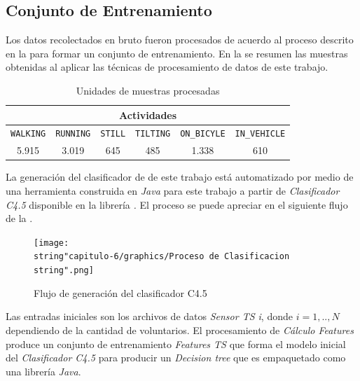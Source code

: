 \subsection{Conjunto de Entrenamiento }

Los datos recolectados en bruto fueron procesados de acuerdo al proceso
descrito en la  para formar un conjunto
de entrenamiento. En la  se resumen las muestras
obtenidas al aplicar las técnicas de procesamiento de datos de este
trabajo. 

\begin{table}[h]
\begin{centering}
\begin{tabular}{|c|c|c|c|c|c|}
\hline 
\multicolumn{6}{|c|}{Actividades}\tabularnewline
\hline 
\texttt{\footnotesize{}WALKING} & \texttt{\footnotesize{}RUNNING} & \texttt{\footnotesize{}STILL} & \texttt{\footnotesize{}TILTING} & \texttt{\footnotesize{}ON\_BICYLE} & \texttt{\footnotesize{}IN\_VEHICLE}\tabularnewline
\hline 
\hline 
5.915 & 3.019 & 645 & 485 & 1.338 & 610\tabularnewline
\hline 
\end{tabular}
\par\end{centering}
\caption{\label{tab6:muestras}Unidades de muestras procesadas}
\end{table}

La generación del clasificador de  de este trabajo está
automatizado por medio de una herramienta construida en \emph{Java
}para este trabajo\emph{ }a partir de \emph{Clasificador C4.5} disponible
en la librería \emph{. }El proceso se puede apreciar en
el siguiente flujo de la .

\begin{figure}[th]
\begin{centering}
\texttt{[image: \\string"capitulo-6/graphics/Proceso de Clasificacion\\string".png]}
\par\end{centering}
\caption{\label{fig6:proceso-clasi}Flujo de generación del clasificador C4.5}
\end{figure}

Las entradas iniciales son los archivos de datos \emph{Sensor TS i},
donde $i=1,..,N$ dependiendo de la cantidad de voluntarios. El procesamiento
de \emph{Cálculo Features} produce un conjunto de entrenamiento \emph{Features
TS }que forma el modelo inicial del \emph{Clasificador C4.5} para
producir un \emph{Decision tree} que es empaquetado como una librería
\emph{Java}.

